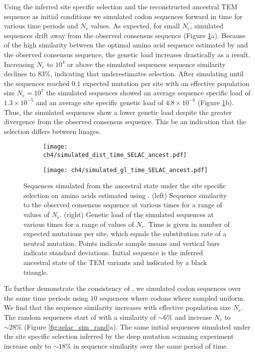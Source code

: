 Using the \selac inferred site specific selection and the reconstructed ancestral TEM sequence as initial conditions we simulated codon sequences forward in time for various time periods and $N_e$ values.
As expected, for small $N_e$, simulated sequences drift away from the observed consensus sequence (Figure \ref{fig:selac_sim}a). 
Because of the high similarity between the optimal amino acid sequence estimated by \selac and the observed consensus sequence, the genetic load increases drastically as a result.
Increasing $N_e$ to $10^4$ or above the simulated sequences sequence similarity declines to $83 \%$, indicating that \selac underestimates selection.
After simulating until the sequences reached $0.1$ expected mutation per site with an effective population size $N_e = 10^7$ the simulated sequences showed an average sequence specific load of $1.3\times10^{-5}$ and an average site specific genetic load of $4.8\times10^{-8}$ (Figure \ref{fig:selac_sim}b).
Thus, the simulated sequences show a lower genetic load despite the greater divergence from the observed consensus sequence.
This be an indication that the selection differs between linages.


\begin{figure}
    \centering
    \begin{subfigure}
        \centering
        \texttt{[image: ch4/simulated\_dist\_time\_SELAC\_ancest.pdf]}
    \end{subfigure}
    \begin{subfigure}
        \centering
        \texttt{[image: ch4/simulated\_gl\_time\_SELAC\_ancest.pdf]}
    \end{subfigure}
    \caption{Sequences simulated from the ancestral state under the site specific selection on amino acids estimated using \selac. 
    (left) Sequence similarity to the observed consensus sequence at various times for a range of values of $N_e$.
    (right) Genetic load of the simulated sequences at various times for a range of values of $N_e$.
    Time is given in number of expected mutations per site, which equals the substitution rate of a neutral mutation.
    Points indicate sample means and vertical bars indicate standard deviations. Initial sequence is the inferred ancestral state of the TEM variants and indicated by a black triangle.}
    \label{fig:selac_sim}
\end{figure}

To further demonstrate the consistency of \selac, we simulated codon sequences over the same time periods using $10$ sequences where codons where sampled uniform.
We find that the sequence similarity increases with effective population size $N_e$.
The random sequences start of with a similarity of $\sim6 \%$ and increase $N_e$ to $\sim28 \%$ (Figure \ref{fig:selac_sim_rand}a).
The same initial sequences simulated under the site specific selection inferred by the deep mutation scanning experiment increase only to $\sim18 \%$ in sequence similarity over the same period of time.


